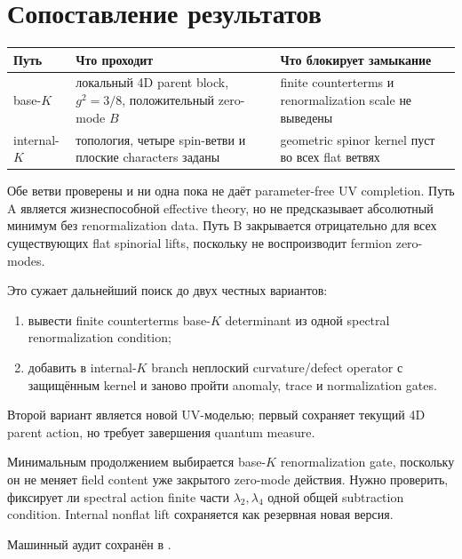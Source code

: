 \section{Сопоставление результатов}

\begin{center}
\begin{tabular}{p{}p{}p{}}
\toprule
Путь & Что проходит & Что блокирует замыкание \\
\midrule
base-\(K\)
& локальный 4D parent block, \(g^2=3/8\), положительный zero-mode \(B\)
& finite counterterms и renormalization scale не выведены \\
internal-\(K\)
& топология, четыре spin-ветви и плоские characters заданы
& geometric spinor kernel пуст во всех flat ветвях \\
\bottomrule
\end{tabular}
\end{center}

\begin{theorem}
Обе ветви проверены и ни одна пока не даёт parameter-free UV completion.
Путь A является жизнеспособной effective theory, но не предсказывает
абсолютный минимум без renormalization data. Путь B закрывается
отрицательно для всех существующих flat spinorial lifts, поскольку не
воспроизводит fermion zero-modes.
\end{theorem}

Это сужает дальнейший поиск до двух честных вариантов:
\begin{enumerate}
 \item вывести finite counterterms base-\(K\) determinant из одной
 spectral renormalization condition;
 \item добавить в internal-\(K\) branch неплоский curvature/defect
 operator с защищённым kernel и заново пройти anomaly, trace и
 normalization gates.
\end{enumerate}
Второй вариант является новой UV-моделью; первый сохраняет текущий 4D
parent action, но требует завершения quantum measure.

\begin{protocol}
Минимальным продолжением выбирается base-\(K\) renormalization gate,
поскольку он не меняет field content уже закрытого zero-mode действия.
Нужно проверить, фиксирует ли spectral action finite части
\(\lambda_2,\lambda_4\) одной общей subtraction condition. Internal
nonflat lift сохраняется как резервная новая версия.
\end{protocol}

Машинный аудит сохранён в
.